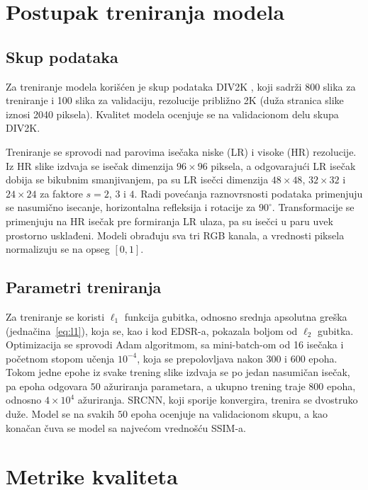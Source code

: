 \documentclass[12pt,a4paper]{article}
\begin{document}
\section{Postupak treniranja modela}
\label{sec:treniranje}

\subsection{Skup podataka}

Za treniranje modela korišćen je skup podataka DIV2K \cite{DIV2K}, koji sadrži 800 slika za treniranje i 100 slika za validaciju, rezolucije približno 2K (duža stranica slike iznosi 2040 piksela). Kvalitet modela ocenjuje se na validacionom delu skupa DIV2K.

Treniranje se sprovodi nad parovima isečaka niske (LR) i visoke (HR) rezolucije. Iz HR slike izdvaja se isečak dimenzija $96\times96$ piksela, a odgovarajući LR isečak dobija se bikubnim smanjivanjem, pa su LR isečci dimenzija $48\times48$, $32\times32$ i $24\times24$ za faktore $s=2$, $3$ i $4$. Radi povećanja raznovrsnosti podataka primenjuju se nasumično isecanje, horizontalna refleksija i rotacije za $90^\circ$. Transformacije se primenjuju na HR isečak pre formiranja LR ulaza, pa su isečci u paru uvek prostorno usklađeni. Modeli obrađuju sva tri RGB kanala, a vrednosti piksela normalizuju se na opseg $[0,1]$.

\subsection{Parametri treniranja}

Za treniranje se koristi $\ell_1$ funkcija gubitka, odnosno srednja apsolutna greška (jednačina~\eqref{eq:l1}), koja se, kao i kod EDSR-a, pokazala boljom od $\ell_2$ gubitka. Optimizacija se sprovodi Adam algoritmom, sa mini-batch-om od 16 isečaka i početnom stopom učenja $10^{-4}$, koja se prepolovljava nakon $300$ i $600$ epoha. Tokom jedne epohe iz svake trening slike izdvaja se po jedan nasumičan isečak, pa epoha odgovara $50$ ažuriranja parametara, a ukupno trening traje $800$ epoha, odnosno $4\times10^4$ ažuriranja. SRCNN, koji sporije konvergira, trenira se dvostruko duže. Model se na svakih $50$ epoha ocenjuje na validacionom skupu, a kao konačan čuva se model sa najvećom vrednošću SSIM-a.

\section{Metrike kvaliteta}
\label{sec:metrike}
\end{document}
